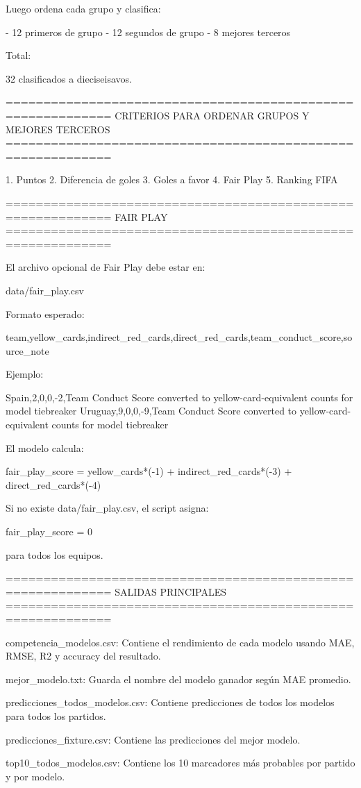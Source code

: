Luego ordena cada grupo y clasifica:

- 12 primeros de grupo
- 12 segundos de grupo
- 8 mejores terceros

Total:

32 clasificados a dieciseisavos.

============================================================
CRITERIOS PARA ORDENAR GRUPOS Y MEJORES TERCEROS
============================================================

1. Puntos
2. Diferencia de goles
3. Goles a favor
4. Fair Play
5. Ranking FIFA

============================================================
FAIR PLAY
============================================================

El archivo opcional de Fair Play debe estar en:

data/fair_play.csv

Formato esperado:

team,yellow_cards,indirect_red_cards,direct_red_cards,team_conduct_score,source_note

Ejemplo:

Spain,2,0,0,-2,Team Conduct Score converted to yellow-card-equivalent counts for model tiebreaker
Uruguay,9,0,0,-9,Team Conduct Score converted to yellow-card-equivalent counts for model tiebreaker

El modelo calcula:

fair_play_score = yellow_cards*(-1) + indirect_red_cards*(-3) + direct_red_cards*(-4)

Si no existe data/fair_play.csv, el script asigna:

fair_play_score = 0

para todos los equipos.

============================================================
SALIDAS PRINCIPALES
============================================================

competencia_modelos.csv:
Contiene el rendimiento de cada modelo usando MAE, RMSE, R2 y accuracy del resultado.

mejor_modelo.txt:
Guarda el nombre del modelo ganador según MAE promedio.

predicciones_todos_modelos.csv:
Contiene predicciones de todos los modelos para todos los partidos.

predicciones_fixture.csv:
Contiene las predicciones del mejor modelo.

top10_todos_modelos.csv:
Contiene los 10 marcadores más probables por partido y por modelo.

